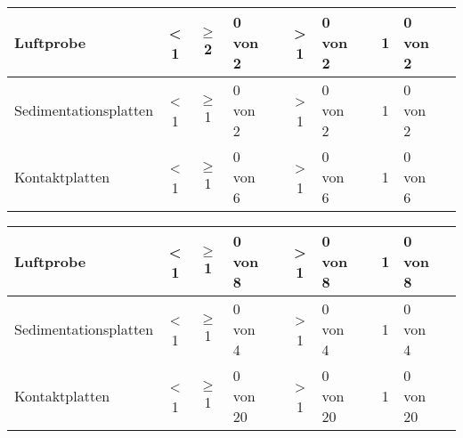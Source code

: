 \begin{Form}
\begin{tabularx}{\textwidth}{|l|c|c|X|c|c|X|c|c|X|c|}
	\hline
	Luftprobe & 
	< 1  & $\geq$ 2 & 0 von 2 & \CheckBox[width=0.6em,height=0.6em,checked,name=ch28]{}& > 1  & 0 von 2 &  \CheckBox[width=0.6em,height=0.6em,checked,name=ch29]{}&
	1 & 0 von 2 &  \CheckBox[width=0.6em,height=0.6em,checked,name=ch30]{} \\
	\hline
	Sedimentationsplatten & 
	< 1  & $\geq$ 1 & 0 von 2 & \CheckBox[width=0.6em,height=0.6em,checked,name=ch31]{}& > 1  & 0 von 2 &  \CheckBox[width=0.6em,height=0.6em,checked,name=ch32]{}&
	1 & 0 von 2 &  \CheckBox[width=0.6em,height=0.6em,checked,name=ch33]{} \\
	\hline
	Kontaktplatten & 
	< 1  & $\geq$ 1 & 0 von 6 & \CheckBox[width=0.6em,height=0.6em,checked,name=ch34]{}& > 1  & 0 von 6 &  \CheckBox[width=0.6em,height=0.6em,checked,name=ch35]{}&
	1 & 0 von 6 &  \CheckBox[width=0.6em,height=0.6em,checked,name=ch36]{} \\
	\hline
\end{tabularx}

\vspace{1ex}
\raum \qquad \kklasse \qquad \betriebszustand

\begin{tabularx}{\textwidth}{|l|c|c|X|c|c|X|c|c|X|c|}
	
	\hline
	Luftprobe & 
	< 1  & $\geq$ 1 & 0 von 8 & \CheckBox[width=0.6em,height=0.6em,checked,name=ch37]{}& > 1  & 0 von 8 &  \CheckBox[width=0.6em,height=0.6em,checked,name=ch38]{}&
	1 & 0 von 8 &  \CheckBox[width=0.6em,height=0.6em,checked,name=ch39]{} \\
	\hline
	Sedimentationsplatten & 
	< 1  & $\geq$ 1 & 0 von 4 & \CheckBox[width=0.6em,height=0.6em,checked,name=ch40]{}& > 1  & 0 von 4 &  \CheckBox[width=0.6em,height=0.6em,checked,name=ch41]{}&
	1 & 0 von 4 &  \CheckBox[width=0.6em,height=0.6em,checked,name=ch42]{} \\
	\hline
	Kontaktplatten & 
	< 1  & $\geq$ 1 & 0 von 20 & \CheckBox[width=0.6em,height=0.6em,checked,name=ch43]{}& > 1  & 0 von 20 &  \CheckBox[width=0.6em,height=0.6em,checked,name=ch44]{}&
	1 & 0 von 20 &  \CheckBox[width=0.6em,height=0.6em,checked,name=ch45]{} \\
	\hline
\end{tabularx}
\vspace{70pt}%


\end{Form}
